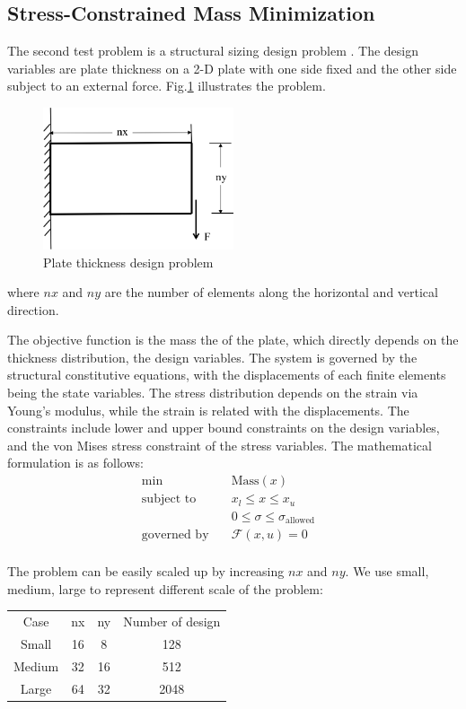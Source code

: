 \documentclass{article}
\theoremstyle{definition}
\begin{document}
\subsection{Stress-Constrained Mass Minimization}
The second test problem is a structural sizing design problem \cite{dener:scitech2016}. The design variables are plate thickness on a 2-D plate with one side fixed and the other side subject to an external force. Fig.\ref{fig:struct} illustrates the problem.
\begin{figure}[H]
  \centering
  \includegraphics[width=0.5\textwidth]{./figs/structures.png}
  \caption{Plate thickness design problem}
  \label{fig:struct}
\end{figure}
where $nx$ and $ny$ are the number of elements along the horizontal and vertical direction. 

The objective function is the mass the of the plate, which directly depends on the thickness distribution, the design variables. The system is governed by the structural constitutive equations, with the displacements of each finite elements being the state variables. The stress distribution depends on the strain via Young's modulus, while the strain is related with the displacements. The constraints include lower and upper bound constraints on the design variables, and the von Mises stress constraint of the stress variables. The mathematical formulation is as follows:
\begin{equation*}
\begin{aligned}
\text{min}  \quad & \text{Mass}(x) &\\
\text{subject to} \quad & x_l \leq x \leq x_u  \\
 &   0 \leq \sigma \leq  \sigma_{\text{allowed}} \\
\text{governed by} \quad &  \mathcal{F}(x, u) = 0 \\
\end{aligned}
\end{equation*}

The problem can be easily scaled up by increasing $nx$ and $ny$. We use small, medium, large to represent different scale of the problem:
\begin{center}
\begin{tabular}{ c c c c }
Case & nx  & ny & Number of design \\
 Small &   16 & 8 & 128 \\ 
 Medium &  32 & 16 & 512 \\  
 Large & 64 & 32 & 2048   
\end{tabular}
\end{center}
\end{document}
